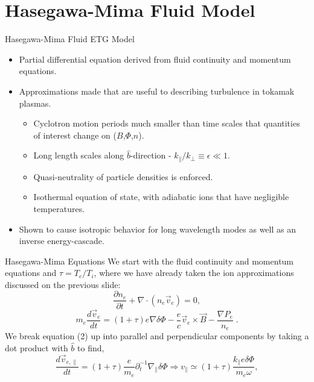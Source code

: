 \documentclass[aspectratio=43]{beamer}
\begin{document}
   \section{Hasegawa-Mima Fluid Model}

   \begin{frame}{Hasegawa-Mima Fluid ETG Model}
      \begin{itemize}
         \item Partial differential equation derived from fluid continuity and momentum equations.
         \item Approximations made that are useful to describing  turbulence in tokamak plasmas.
         \begin{itemize}
            \item Cyclotron motion periods much smaller than time scales that quantities of interest change on ($B$,$\Phi$,$n$).
            \item Long length scales along $\hat{b}$-direction - $k_{\parallel}/k_{\perp}\equiv\epsilon\ll1$.
            \item Quasi-neutrality of particle densities is enforced.
            \item Isothermal equation of state, with adiabatic ions that have negligible temperatures.
         \end{itemize}
         \item Shown to cause isotropic behavior for long wavelength modes as well as an inverse energy-cascade.
      \end{itemize}
   \end{frame}

   \begin{frame}{Hasegawa-Mima Equations}
      \quad We start with the fluid continuity and momentum equations and $\tau = T_e/T_i$, where we have already taken the ion approximations discussed
   on the previous slide:
      \begin{equation}
         \frac{\partial n_e}{\partial t} + \nabla\cdot\left(n_e\vec{v}_e\right) = 0,
      \end{equation}
      \begin{equation}
            m_e\frac{d\vec{v}_e}{dt} = \left(1+\tau\right)e\nabla\delta\Phi - \frac{e}{c}\vec{v}_e\times\vec{B}-\frac{\nabla P_e}{n_e}\;.
      \end{equation}
      \quad We break equation (2) up into parallel and perpendicular components by taking a dot product with $\hat{b}$ to find,
      \begin{equation}
         \frac{d\vec{v}_{e,\parallel}}{dt} = (1+\tau)\frac{e}{m_e}\partial_t^{-1}\nabla_{\parallel}\delta\Phi \Rightarrow v_{\parallel}
            \simeq (1+\tau)\frac{k_{\parallel}e\delta\Phi}{m_e\omega},
      \end{equation}
   \end{frame}
\end{document}
